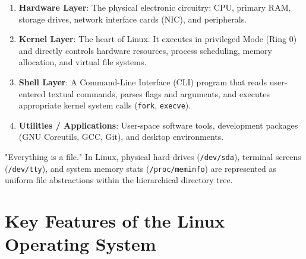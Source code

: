 \begin{enumerate}[leftmargin=1.5em]
    \item \textbf{Hardware Layer}: The physical electronic circuitry: CPU, primary RAM, storage drives, network interface cards (NIC), and peripherals.
    \item \textbf{Kernel Layer}: The heart of Linux. It executes in privileged Mode (Ring 0) and directly controls hardware resources, process scheduling, memory allocation, and virtual file systems.
    \item \textbf{Shell Layer}: A Command-Line Interface (CLI) program that reads user-entered textual commands, parses flags and arguments, and executes appropriate kernel system calls (\texttt{fork}, \texttt{execve}).
    \item \textbf{Utilities / Applications}: User-space software tools, development packages (GNU Coreutils, GCC, Git), and desktop environments.
\end{enumerate}

\begin{keyequation}
"Everything is a file." In Linux, physical hard drives (\texttt{/dev/sda}), terminal screens (\texttt{/dev/tty}), and system memory stats (\texttt{/proc/meminfo}) are represented as uniform file abstractions within the hierarchical directory tree.
\end{keyequation}

\section{Key Features of the Linux Operating System}

